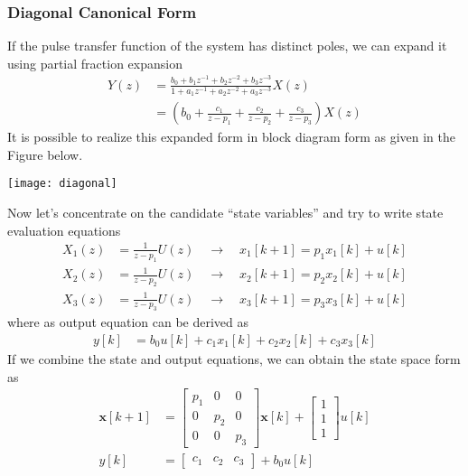 \documentclass[twoside]{article}
\begin{document}
\subsubsection*{Diagonal Canonical Form}

If the pulse transfer function of the system 
has distinct poles, we can expand it 
using partial fraction expansion 
%
\begin{align*}
Y(z) &= \frac{b_0 + b_1 z^{-1} + b_2 z^{-2} + b_3 z^{-3}}{1+ a_1
       z^{-1} + a_2 z^{-2} + a_3 z^{-3}} X(z)
\\
&= \left( b_0 + \frac{c_1}{z - p_1} + \frac{c_2}{z - p_2}
+ \frac{c_3}{z - p_3} \right) X(z)
\end{align*}
%
It is possible to realize this expanded form in block diagram 
form as given in the Figure below.
%
     \begin{center}
 \begin{minipage}[h]{0.5\linewidth}
     \begin{center}
       \texttt{[image: diagonal]}
     \end{center}
 \end{minipage}
     \end{center}
%
Now let's concentrate on the candidate ``state variables''
and try to write state evaluation equations
%
\begin{align*}
X_1(z) &= \frac{1}{z - p_1} U(z) \quad \rightarrow \quad x_1[k+1] = p_1
  x_1[k] + u[k]
\\
X_2(z) &= \frac{1}{z - p_2} U(z) \quad \rightarrow \quad x_2[k+1] = p_2
  x_2[k] + u[k]
\\
X_3(z) &= \frac{1}{z - p_3} U(z) \quad \rightarrow \quad x_3[k+1] = p_3
  x_3[k] + u[k]
\end{align*}
%
where as output equation can be derived as
%
\begin{align*}
y[k] &= b_0 u[k] + c_1 x_1[k] + c_2 x_2[k] + c_3 x_3[k]
\end{align*}
%
If we combine the state and output equations, we
can obtain the state space form as
%
%
\begin{align*}
  \mathbf{x}[k+1] &= \left[ \begin{array}{ccc} p_1 & 0 & 0\\ 0 & p_2 & 0
    \\ 0 & 0 & p_3 \end{array} \right] \mathbf{x}[k]
   + 
  \left[ \begin{array}{c} 1 \\ 1
    \\ 1 \end{array} \right] u[k]
\\
y[k] &= \left[ \begin{array}{ccc} c_1 & c_2 & c_3 \end{array} \right]
+ b_0 u[k]
\end{align*}
\end{document}

